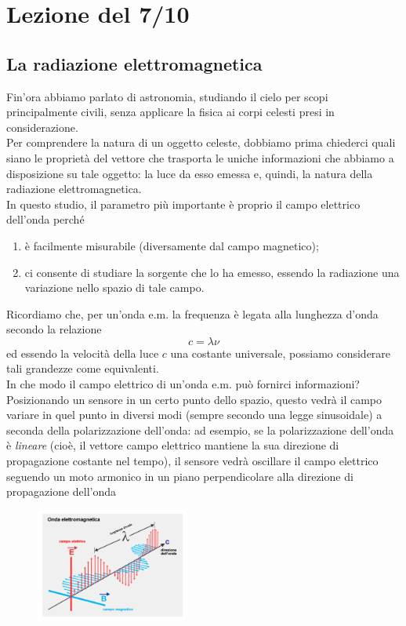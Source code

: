 \documentclass[a4paper,11pt]{article}
\begin{document}
\newpage
\section{Lezione del 7/10}
\subsection{La radiazione elettromagnetica}
Fin'ora abbiamo parlato di astronomia, studiando il cielo per scopi principalmente civili, senza applicare la fisica ai corpi celesti presi in considerazione. \\
Per comprendere la natura di un oggetto celeste, dobbiamo prima chiederci quali siano le proprietà del vettore che trasporta le uniche informazioni che abbiamo a disposizione su tale oggetto: la luce da esso emessa e, quindi, la natura della radiazione elettromagnetica.\\
In questo studio, il parametro più importante è proprio il campo elettrico dell'onda perché 
\begin{enumerate}
    \item è facilmente misurabile (diversamente dal campo magnetico);
    \item ci consente di studiare la sorgente che lo ha emesso, essendo la radiazione una variazione nello spazio di tale campo.
\end{enumerate} 

Ricordiamo che, per un'onda e.m. la frequenza è legata alla lunghezza d'onda secondo la relazione $$ c = {\lambda}{\nu}$$ ed essendo la velocità della luce \(c\) una costante universale, possiamo considerare tali grandezze come equivalenti.
\\ In che modo il campo elettrico di un'onda e.m. può fornirci informazioni? Posizionando un sensore in un certo punto dello spazio, questo vedrà il campo variare in quel punto in diversi modi (sempre secondo una legge sinusoidale) a seconda della polarizzazione dell'onda:  ad esempio, se la polarizzazione dell'onda è \textit{lineare} (cioè, il vettore campo elettrico mantiene la sua direzione di propagazione costante nel tempo), il sensore vedrà oscillare il campo elettrico seguendo un moto armonico in un piano perpendicolare alla direzione di propagazione dell'onda
\begin{figure}[h!!]
    \centering
    \includegraphics[width=5cm]{onda-elettromagnetica.png}
    \label{fig:my_label1}
\end{figure}
\end{document}
